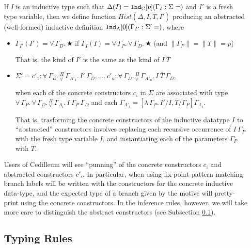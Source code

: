 \documentclass{article}
\newcommand{\ann}[2]{#1\! : \! #2}
\newcommand{\absu}[3]{{#1}\, #2.\, #3}
\newcommand{\indast}[5]{\texttt{Ind}_{#1} [#2] (#3 : #4 = #5)}
\newcommand{\lenc}[1]{\|#1\|}
\newcommand{\vars}[1]{{\overline{#1}}}
\newcommand{\piforall}{^{\Pi}_{\forall}}
\begin{document}
If $I$ is an inductive type such that $\Delta(I) =
\indast{\text{C}}{p}{\Gamma_I}{\Sigma}$ and $I'$ is a fresh type variable, then we
define function $Hist(\Delta,I,\vars{T},I')$ producing an abstracted (well-formed)
inductive definition $\indast{\text{A}}{0}{\Gamma_{I'}}{\Sigma'}$, where

\begin{itemize}
\item $\Gamma_{I'}(I') = \absu{\forall}{\Gamma_D}{★}$ if $\Gamma_{I}(I) =
  \absu{\forall}{\Gamma_{P}}{\absu{\forall}{\Gamma_D}{★}}$ (and $\lenc{\Gamma_P}
  = \lenc{\vars{T}} = p$)

  That is, the kind of $I'$ is the same as the kind of $I\ \vars{T}$
\item $\Sigma' = \ann{c'_1}{\absu{\forall}{\Gamma_D}
    { \absu{\piforall}{\Gamma_{A'_1}}{I'\ \Gamma_D} }},...,
  \ann{c'_n}{\absu{\forall}{\Gamma_D}
    { \absu{\piforall}{\Gamma_{A'_n}}{I\ \vars{T}\ \Gamma_D} }}$,

  when each of the concrete constructors $c_i$ in $\Sigma$ are associated with
  type $\absu{\forall}{\Gamma_P}{
    \absu{\forall}{\Gamma_D}{ \absu{\piforall}{\Gamma_{A_i}}{I\ \Gamma_P\
        \Gamma_D} } }$ and each $\Gamma_{A'_i} =
  [\absu{\lambda}{\Gamma_P}{I'}/I,\vars{T}/\Gamma_P]\Gamma_{A_i}$.

  That is, trasforming the concrete constructors of the inductive datatype $I$
  to ``abstracted'' constructors involves replacing each recursive occurrence of
  $I\ \Gamma_P$ with the fresh type variable $I$, and instantiating each of the
  parameters $\Gamma_P$ with $\vars{T}$.
\end{itemize}

Users of Cedilleum will see ``punning'' of the concrete constructors $c_i$ and
abstracted constructors $c'_i$. In particular, when using fix-point pattern
matching branch labels will be written with the constructors for the concrete
inductive data-type, and the expected type of a branch given by the motive will
pretty-print using the concrete constructors. In the inference rules, however,
we will take more care to distinguish the abstract constructors (see Subsection
\ref{ssec:typing-rules}).

\subsection{Typing Rules}
\label{ssec:typing-rules}
\end{document}
